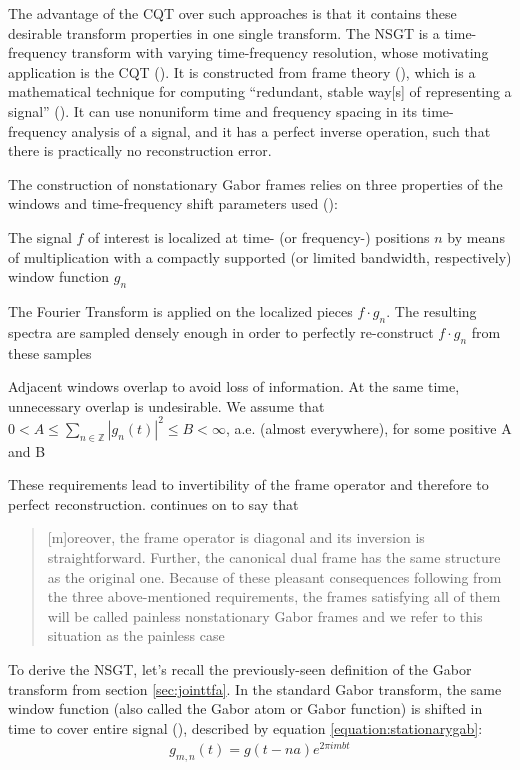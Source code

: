 \documentclass[report.tex]{subfiles}
\begin{document}
The advantage of the CQT over such approaches is that it contains these desirable transform properties in one single transform. The NSGT is a time-frequency transform with varying time-frequency resolution, whose motivating application is the CQT (\cite{jaillet, balazs}). It is constructed from frame theory (\cite{frametheory}), which is a mathematical technique for computing ``redundant, stable way[s] of representing a signal'' (\cite{framesintro}). It can use nonuniform time and frequency spacing in its time-frequency analysis of a signal, and it has a perfect inverse operation, such that there is practically no reconstruction error.

The construction of nonstationary Gabor frames relies on three properties of the windows and time-frequency shift parameters used (\cite{balazs}):
\begin{tight_itemize}
	\item
		The signal $f$ of interest is localized at time- (or frequency-) positions $n$ by means of multiplication with a compactly supported (or limited bandwidth, respectively) window function $g_{n}$
	\item
		The Fourier Transform is applied on the localized pieces $f \cdot g_{n}$. The resulting spectra are sampled densely enough in order to perfectly re-construct $f \cdot g_{n}$ from these samples
	\item
		Adjacent windows overlap to avoid loss of information. At the same time, unnecessary overlap is undesirable. We assume that $0 < A \le \sum_{n \in \mathbb{Z}}|g_{n}(t)|^{2} \le B < \infty$, a.e. (almost everywhere), for some positive A and B
\end{tight_itemize}

These requirements lead to invertibility of the frame operator and therefore to perfect reconstruction. \textcite{balazs} continues on to say that

\begin{quote}
	[m]oreover, the frame operator is diagonal and its inversion is straightforward. Further, the canonical dual frame has the same structure as the original one. Because of these pleasant consequences following from the three above-mentioned requirements, the frames satisfying all of them will be called painless nonstationary Gabor frames and we refer to this situation as the painless case
\end{quote}

To derive the NSGT, let's recall the previously-seen definition of the Gabor transform from section \ref{sec:jointtfa}. In the standard Gabor transform, the same window function (also called the Gabor atom or Gabor function) is shifted in time to cover entire signal (\cite{adaptivecqt}), described by equation \ref{equation:stationarygab}:
\begin{align} \tag{10}\label{equation:stationarygab}
g_{m, n}(t) = g(t - na)e^{2\pi i m b t}
\end{align}
\end{document}
